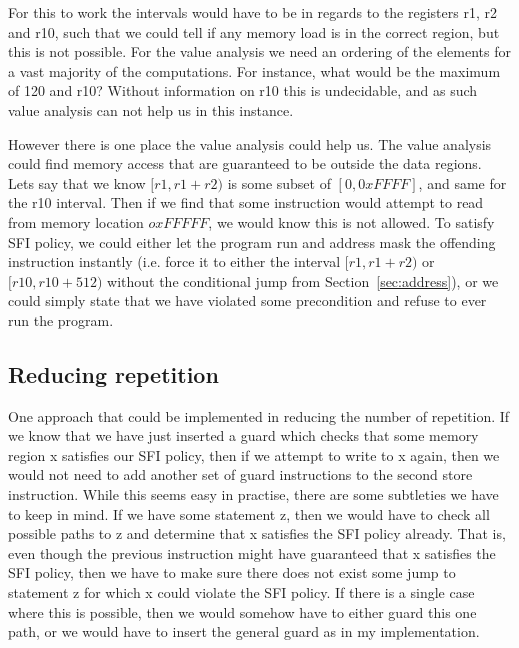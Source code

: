 For this to work the intervals would have to be in regards to the registers r1,
r2 and r10, such that we could tell if any memory load is in the correct
region, but this is not possible. For the value analysis we need an ordering of
the elements for a vast majority of the computations. For instance, what would
be the maximum of 120 and r10? Without information on r10 this is undecidable,
and as such value analysis can not help us in this instance.

However there is one place the value analysis could help us. The value analysis
could find memory access that are guaranteed to be outside the data regions.
Lets say that we know $[r1,r1 + r2)$ is some subset of $[0, 0xFFFF]$, and same
for the r10 interval. Then if we find that some instruction would attempt to
read from memory location $oxFFFFF$, we would know this is not allowed. To
satisfy SFI policy, we could either let the program run and address mask the
offending instruction instantly (i.e. force it to either the interval $[r1,
r1+r2)$ or $[r10, r10+512)$ without the conditional jump from
Section~\ref{sec:address}), or we could simply state that we have violated some
precondition and refuse to ever run the program. 

\subsection{Reducing repetition} One approach that could be implemented in
reducing the number of repetition. If we know that we have just inserted a
guard which checks that some memory region x satisfies our SFI policy, then if
we attempt to write to x again, then we would not need to add another set of
guard instructions to the second store instruction. While this seems easy in
practise, there are some subtleties we have to keep in mind. If we have some
statement z, then we would have to check all possible paths to z and determine
that x satisfies the SFI policy already. That is, even though the previous
instruction might have guaranteed that x satisfies the SFI policy, then we have
to make sure there does not exist some jump to statement z for which x could
violate the SFI policy. If there is a single case where this is possible, then
we would somehow have to either guard this one path, or we would have to insert
the general guard as in my implementation. 

